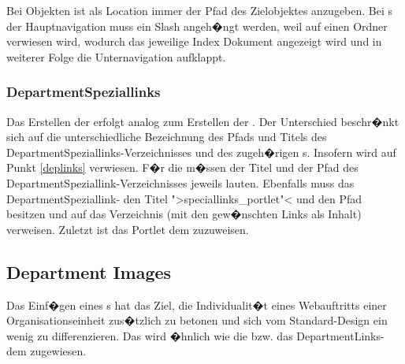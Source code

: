 \begin{Hinweis}
  Bei  Objekten ist als Location immer der Pfad des
  Zielobjektes anzugeben. Bei s der Hauptnavigation
  muss ein Slash angeh�ngt werden, weil auf einen Ordner verwiesen
  wird, wodurch das jeweilige Index Dokument angezeigt wird und in
  weiterer Folge die Unternavigation aufklappt.
\end{Hinweis}

\subsubsection{DepartmentSpeziallinks}
\label{depspeclinks}

Das Erstellen der  erfolgt analog zum Erstellen der
. Der Unterschied beschr�nkt sich auf die unterschiedliche
Bezeichnung des Pfads und Titels des DepartmentSpeziallinks-Verzeichnisses und des
zugeh�rigen s. Insofern wird auf Punkt \ref{deplinks} verwiesen. F�r die  m�ssen der Titel und der Pfad des DepartmentSpeziallink-Verzeichnisses jeweils  lauten. Ebenfalls muss das DepartmentSpeziallink- den Titel ">speciallinks\_portlet"< und den Pfad  besitzen und auf das Verzeichnis  (mit den gew�nschten Links als Inhalt) verweisen. Zuletzt ist das Portlet dem  zuzuweisen.

\subsection{Department Images}
\label{depimg}

Das Einf�gen eines s hat das Ziel, die Individualit�t eines
Webauftritts einer Organisationseinheit zus�tzlich zu betonen und sich vom
Standard-Design ein wenig zu differenzieren.
Das  wird �hnlich wie die  bzw. das DepartmentLinks- dem  zugewiesen.


